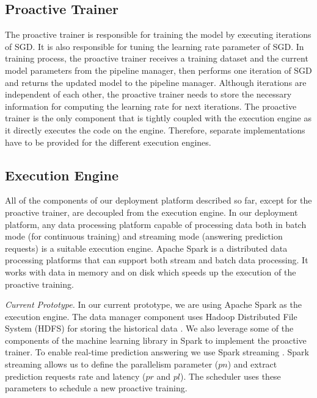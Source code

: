 \subsection{Proactive Trainer} 
The proactive trainer is responsible for training the model by executing iterations of SGD.
It is also responsible for tuning the learning rate parameter of SGD.
In training process, the proactive trainer receives a training dataset and the current model parameters from the pipeline manager, then performs one iteration of SGD and returns the updated model to the pipeline manager.
Although iterations are independent of each other, the proactive trainer needs to store the necessary information for computing the learning rate for next iterations.
The proactive trainer is the only component that is tightly coupled with the execution engine as it directly executes the code on the engine.
Therefore, separate implementations have to be provided for the different execution engines.

\subsection{Execution Engine}
All of the components of our deployment platform described so far, except for the proactive trainer, are decoupled from the execution engine.
In our deployment platform, any data processing platform capable of processing data both in batch mode (for continuous training) and streaming mode (answering prediction requests) is a suitable execution engine.
Apache Spark \cite{zaharia2010spark} is a distributed data processing platforms that can support both stream and batch data processing.
It works with data in memory and on disk which speeds up the execution of the proactive training.

\textit{Current Prototype.}
In our current prototype, we are using Apache Spark \cite{zaharia2010spark} as the execution engine.
The data manager component uses Hadoop Distributed File System (HDFS) for storing the historical data \cite{shvachko2010hadoop}.
We also leverage some of the components of the machine learning library in Spark to implement the proactive trainer.
To enable real-time prediction answering we use Spark streaming \cite{zaharia2013discretized}.
Spark streaming allows us to define the parallelism parameter ($pn$) and extract prediction requests rate and latency ($pr$ and $pl$).
The scheduler uses these parameters to schedule a new proactive training.
